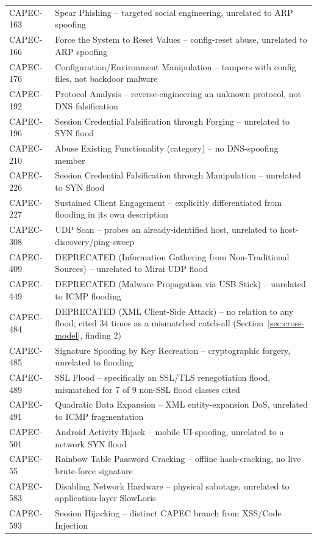 \documentclass[10pt,twocolumn]{article}
\begin{document}
\begin{longtable}{p{}p{}}
CAPEC-163 & Spear Phishing -- targeted social engineering, unrelated to ARP spoofing \\
CAPEC-166 & Force the System to Reset Values -- config-reset abuse, unrelated to ARP spoofing \\
CAPEC-176 & Configuration/Environment Manipulation -- tampers with config files, not backdoor malware \\
CAPEC-192 & Protocol Analysis -- reverse-engineering an unknown protocol, not DNS falsification \\
CAPEC-196 & Session Credential Falsification through Forging -- unrelated to SYN flood \\
CAPEC-210 & Abuse Existing Functionality (category) -- no DNS-spoofing member \\
CAPEC-226 & Session Credential Falsification through Manipulation -- unrelated to SYN flood \\
CAPEC-227 & Sustained Client Engagement -- explicitly differentiated from flooding in its own description \\
CAPEC-308 & UDP Scan -- probes an already-identified host, unrelated to host-discovery/ping-sweep \\
CAPEC-409 & DEPRECATED (Information Gathering from Non-Traditional Sources) -- unrelated to Mirai UDP flood \\
CAPEC-449 & DEPRECATED (Malware Propagation via USB Stick) -- unrelated to ICMP flooding \\
CAPEC-484 & DEPRECATED (XML Client-Side Attack) -- no relation to any flood; cited 34 times as a mismatched catch-all (Section~\ref{sec:cross-model}, finding 2) \\
CAPEC-485 & Signature Spoofing by Key Recreation -- cryptographic forgery, unrelated to flooding \\
CAPEC-489 & SSL Flood -- specifically an SSL/TLS renegotiation flood, mismatched for 7 of 9 non-SSL flood classes cited \\
CAPEC-491 & Quadratic Data Expansion -- XML entity-expansion DoS, unrelated to ICMP fragmentation \\
CAPEC-501 & Android Activity Hijack -- mobile UI-spoofing, unrelated to a network SYN flood \\
CAPEC-55 & Rainbow Table Password Cracking -- offline hash-cracking, no live brute-force signature \\
CAPEC-583 & Disabling Network Hardware -- physical sabotage, unrelated to application-layer SlowLoris \\
CAPEC-593 & Session Hijacking -- distinct CAPEC branch from XSS/Code Injection \\

\end{longtable}
\end{document}
